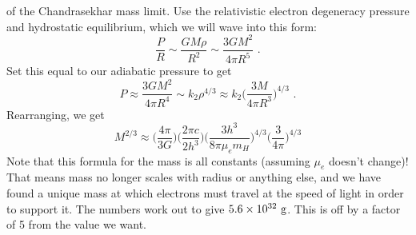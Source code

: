 \begin{enumerate}
       of the Chandrasekhar mass limit.
      Use the relativistic electron degeneracy pressure and hydrostatic equilibrium, which we will wave into this form:
      \begin{equation}
      \frac{P}{R} \sim \frac{G M \rho}{R^2} \sim \frac{3 G M^2}{4 \pi R^5}\,\,.
      \end{equation}
      Set this equal to our adiabatic pressure to get
      \begin{equation}
      P \approx \frac{3 G M^2}{4 \pi R^4} \sim k_2 \rho^{4/3} \approx k_2 \biggl(\frac{3 M}{4 \pi R^3}\biggr)^{4/3}\,\,.
      \end{equation}
      Rearranging, we get
      \begin{equation}
      M^{2/3} \approx \biggl(\frac{4\pi}{3 G} \biggr)\biggl(\frac{2\pi c}{2 h^3} \biggr)\biggl(\frac{3 h^3}{8 \pi \mu_e m_H} \biggr)^{4/3} \biggl(\frac{3}{4 \pi} \biggr)^{4/3}
      \end{equation}
      Note that this formula for the mass is all constants (assuming $\mu_e$ doesn't change)! That means mass no longer scales with radius or anything else, and we have found a unique mass at which electrons must travel at the speed of light in order to support it. The numbers work out to give $5.6 \times 10^{32}~{\rm g}$. This is off by a factor of 5 from the value we want.


\end{enumerate}
